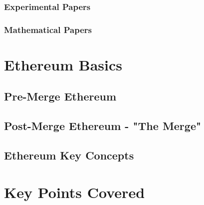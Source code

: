 \subsubsection{Experimental Papers}
\subsubsection{Mathematical Papers}
\section{Ethereum Basics}
\subsection{Pre-Merge Ethereum}
\subsection{Post-Merge Ethereum - "The Merge"}
\subsection{Ethereum Key Concepts}
\section{Key Points Covered}
